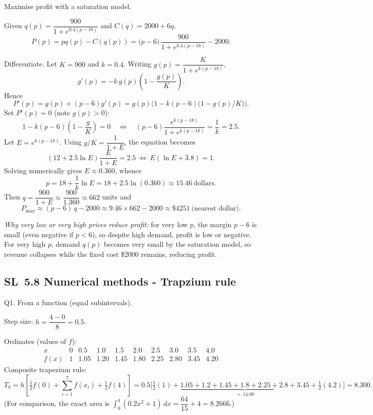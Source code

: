 \documentclass[11pt]{article}
\def\textbf#1{#1}%
\newcommand{\tocsubsection}[1]{\subsection{#1}}
\begin{document}
\begin{solution}
\textbf{Maximise profit with a saturation model.}

Given \(q(p)=\dfrac{900}{1+e^{0.4(p-18)}}\) and \(C(q)=2000+6q\),
\[
P(p)=pq(p)-C(q(p))=\big(p-6\big)\,\frac{900}{1+e^{0.4(p-18)}}-2000.
\]

Differentiate.  Let \(K=900\) and \(k=0.4\).  Writing \(g(p)=\dfrac{K}{1+e^{k(p-18)}}\),
\[
g'(p)=-k\,g(p)\!\left(1-\frac{g(p)}{K}\right).
\]
Hence
\[
P'(p)=g(p)+(p-6)g'(p)=g(p)\Big(1-k(p-6)\big(1-g(p)/K\big)\Big).
\]
Set \(P'(p)=0\) (note \(g(p)>0\)):
\[
1-k(p-6)\!\left(1-\frac{g}{K}\right)=0
\quad\Longleftrightarrow\quad
(p-6)\frac{e^{k(p-18)}}{1+e^{k(p-18)}}=\frac{1}{k}=2.5.
\]
Let \(E=e^{k(p-18)}\).  Using \(g/K=\dfrac{1}{1+E}\), the equation becomes
\[
(12+2.5\ln E)\frac{E}{1+E}=2.5
\ \Longleftrightarrow\
E(\ln E+3.8)=1.
\]
Solving numerically gives \(E\approx 0.360\), whence
\[
p=18+\frac{1}{k}\ln E=18+2.5\ln(0.360)\approx 15.46\ \text{dollars}.
\]
Then \(q=\dfrac{900}{1+E}\approx \dfrac{900}{1.360}\approx 662\) units and
\[
P_{\max}\approx (p-6)\,q-2000 \approx 9.46\times 662-2000 \approx \$4251
\ \text{(nearest dollar)}.
\]

\emph{Why very low or very high prices reduce profit:}
for very low \(p\), the margin \(p-6\) is small (even negative if \(p<6\)), so despite high demand, profit is low or negative.  
For very high \(p\), demand \(q(p)\) becomes very small by the saturation model, so revenue collapses while the fixed cost \$2000 remains, reducing profit.
\end{solution}


\tocsubsection{SL 5.8 \; Numerical methods - Trapzium rule}


\begin{solution}
\textbf{Q1. From a function (equal subintervals).}

Step size: \(h=\dfrac{4-0}{8}=0.5\).

Ordinates (values of \(f\)):
\[
\begin{array}{c|ccccccccc}
x      & 0   & 0.5 & 1.0 & 1.5 & 2.0 & 2.5 & 3.0 & 3.5 & 4.0\\ \hline
f(x)   & 1   & 1.05& 1.20& 1.45& 1.80& 2.25& 2.80& 3.45& 4.20
\end{array}
\]
Composite trapezium rule:
\[
T_8
= h\!\left[\tfrac12 f(0)+\sum_{i=1}^{7} f(x_i)+\tfrac12 f(4)\right]
=0.5\Big[\tfrac12(1)+\underbrace{1.05+1.2+1.45+1.8+2.25+2.8+3.45}_{=\,14.00}
+\tfrac12(4.2)\Big]
= \boxed{8.300}.
\]
(For comparison, the exact area is \(\int_0^4 (0.2x^2+1)\,dx=\dfrac{64}{15}+4=8.266\overline{6}\).)
\end{solution}
\end{document}
